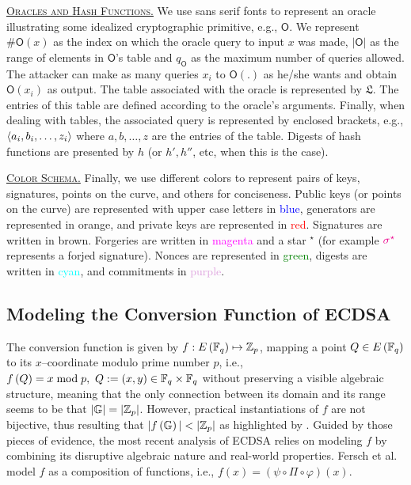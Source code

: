 \documentclass[version=submission, floatrow]{iacrcc}
\begin{document}
\noindent\underline{\textsc{Oracles and Hash Functions}.} We use \textsf{sans serif fonts} to represent an oracle illustrating some idealized cryptographic primitive, e.g., $\mathsf{O}$. 
%
We represent $\#\mathsf{O}\left(x\right)$ as the index on which the oracle query to input $x$ was made, $\left|\mathsf{O}\right|$ as the range of elements in $\mathsf{O}$'s table and $q_{\mathsf{O}}$ as the maximum number of queries allowed. 
%
The attacker can make as many queries $x_{i}$ to $\mathsf{O}\left(.\right)$ as he/she wants and obtain $\mathsf{O}\left(x_{i}\right)$ as output. 
%
The table associated with the oracle is represented by $\mathfrak{L}$. The entries of this table are defined according to the oracle's arguments. 
%
Finally, when dealing with tables, the associated query is represented by enclosed brackets, e.g., $\Braket{a_{i}, b_{i},\ldots, z_{i}}$ where $a,b,\ldots, z$ are the entries of the table. 
%
Digests of hash functions are presented by $h$ (or  $h', h''$, etc, when this is the case).

\noindent\underline{\textsc{Color Schema}.} Finally, we use different colors to represent pairs of keys, signatures, points on the curve, and others for conciseness. Public keys (or points on the curve) are represented with upper case letters in
\textcolor{blue}{blue}, generators are represented in \textcolor{BurntOrange}{orange}, and private keys are represented in \textcolor{red}{red}. Signatures are written in \textcolor{Sepia}{brown}. Forgeries are written in \textcolor{magenta}{magenta} and a star $^{\star}$ (for example $\textcolor{magenta}{\sigma^{\star}}$ represents a forjed signature). Nonces are represented in \textcolor{Green}{green}, digests are written in \textcolor{cyan}{cyan}, and commitments in \textcolor{Plum}{purple}.\label{sec:color-schema}
\subsection{Modeling the Conversion Function of ECDSA}\label{subsec:conversion-function}

The conversion function is given by $f: E \left(\mathbb{F}_{q}\right) \mapsto \mathbb{Z}_{p}$, mapping a point $Q \in E \left(\mathbb{F}_{q}\right)$ to its $x$--coordinate modulo prime number $p$, i.e., $f\left(Q\right) = x \bmod{p},\ Q := \left(x, y\right) \in \mathbb{F}_{q}\times\mathbb{F}_{q}$ without preserving a visible algebraic structure, meaning that the only connection between its domain and its range seems to be that $|\mathbb{G}| = |\mathbb{Z}_{p}|$. However, practical instantiations of $f$ are not bijective, thus resulting that $|f\left(\mathbb{G}\right)| < |\mathbb{Z}_{p}|$ as highlighted by \cite{CCS:FerKilPoe16}. Guided by those pieces of evidence, the most recent analysis of ECDSA relies on modeling $f$ by combining its disruptive algebraic nature and real-world properties. Fersch et al. model $f$ as a composition of functions, i.e., $f(x) = \left(\psi \circ \Pi \circ \varphi\right)(x)$. 
\end{document}
